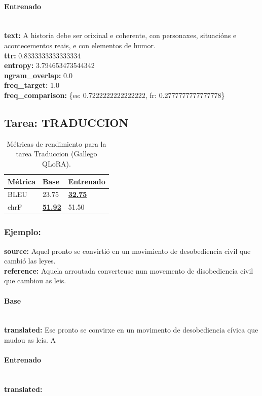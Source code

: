 \paragraph{Entrenado}~\\
\textbf{text:} A historia debe ser orixinal e coherente, con personaxes, situacións e acontecementos reais, e con elementos de humor.\\
\textbf{ttr:} 0.8333333333333334\\
\textbf{entropy:} 3.794653473544342\\
\textbf{ngram\_overlap:} 0.0\\
\textbf{freq\_target:} 1.0\\
\textbf{freq\_comparison:} \{\textquotesingle{}es\textquotesingle{}: 0.7222222222222222, \textquotesingle{}fr\textquotesingle{}: 0.2777777777777778\}

\subsection{Tarea: TRADUCCION}\label{tarea-traduccion}
\begin{longtable}[]{@{}lll@{}}
\toprule\noalign{}
Métrica & Base & Entrenado \\
\midrule\noalign{}
\endhead
\bottomrule\noalign{}
\caption{Métricas de rendimiento para la tarea Traduccion (Gallego QLoRA).}
\label{tab:metricas_traduccion_Gallego QLoRA}
\endlastfoot
BLEU & 23.75 & \textbf{\underline{32.75}} \\
chrF & \textbf{\underline{51.92}} & 51.50 \\
\end{longtable}

\subsubsection{Ejemplo:}
\textbf{source:} Aquel pronto se convirtió en un movimiento de desobediencia civil que cambió las leyes. \\
\textbf{reference:} Aquela arroutada converteuse nun movemento de disobediencia civil que cambiou as leis. 

\paragraph{Base}~\\
\textbf{translated:} Ese pronto se convirxe en un movimento de desobediencia cívica que mudou as leis. A

\paragraph{Entrenado}~\\
\textbf{translated:} 

